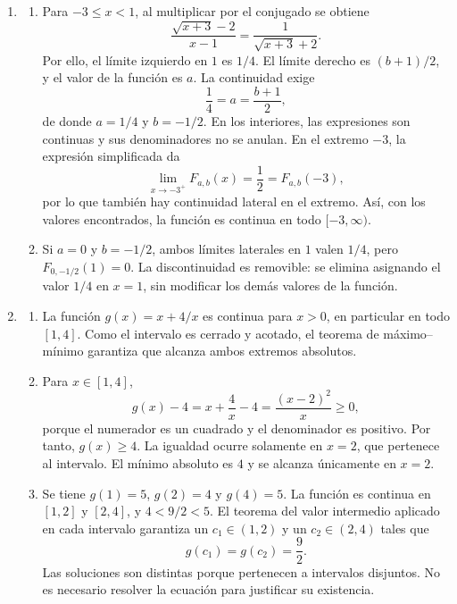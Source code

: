 \documentclass[10pt,a5paper]{article}
\begin{document}
\begin{solucion}[de la versión 2]
\begin{enumerate}
  \item
  \begin{enumerate}
    \item Para $-3\leq x<1$, al multiplicar por el conjugado se obtiene
    \[
      \frac{\sqrt{x+3}-2}{x-1}=\frac1{\sqrt{x+3}+2}.
    \]
    Por ello, el límite izquierdo en $1$ es $1/4$. El límite derecho es $(b+1)/2$, y el valor de la función es $a$. La continuidad exige
    \[
      \frac14=a=\frac{b+1}{2},
    \]
    de donde $a=1/4$ y $b=-1/2$. En los interiores, las expresiones son continuas y sus denominadores no se anulan. En el extremo $-3$, la expresión simplificada da
    \[
      \lim_{x\to-3^+}F_{a,b}(x)=\frac12=F_{a,b}(-3),
    \]
    por lo que también hay continuidad lateral en el extremo. Así, con los valores encontrados, la función es continua en todo $[-3,\infty)$.
    \item Si $a=0$ y $b=-1/2$, ambos límites laterales en $1$ valen $1/4$, pero $F_{0,-1/2}(1)=0$. La discontinuidad es removible: se elimina asignando el valor $1/4$ en $x=1$, sin modificar los demás valores de la función.
  \end{enumerate}
  \item
  \begin{enumerate}
    \item La función $g(x)=x+4/x$ es continua para $x>0$, en particular en todo $[1,4]$. Como el intervalo es cerrado y acotado, el teorema de máximo--mínimo garantiza que alcanza ambos extremos absolutos.
    \item Para $x\in[1,4]$,
    \[
      g(x)-4=x+\frac4x-4=\frac{(x-2)^2}{x}\geq0,
    \]
    porque el numerador es un cuadrado y el denominador es positivo. Por tanto, $g(x)\geq4$. La igualdad ocurre solamente en $x=2$, que pertenece al intervalo. El mínimo absoluto es $4$ y se alcanza únicamente en $x=2$.
    \item Se tiene $g(1)=5$, $g(2)=4$ y $g(4)=5$. La función es continua en $[1,2]$ y $[2,4]$, y $4<9/2<5$. El teorema del valor intermedio aplicado en cada intervalo garantiza un $c_1\in(1,2)$ y un $c_2\in(2,4)$ tales que
    \[
      g(c_1)=g(c_2)=\frac92.
    \]
    Las soluciones son distintas porque pertenecen a intervalos disjuntos. No es necesario resolver la ecuación para justificar su existencia.
  \end{enumerate}

\end{enumerate}
\end{solucion}
\fi
\end{document}
